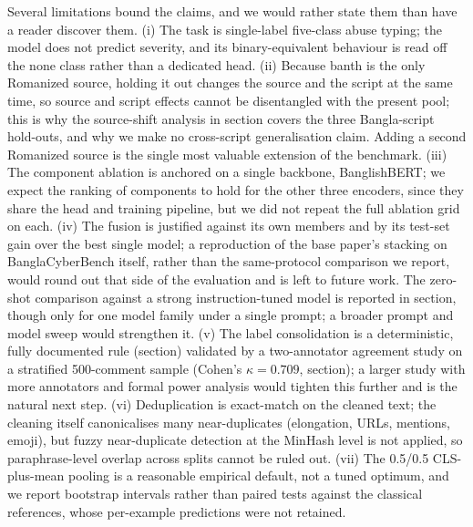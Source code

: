 \documentclass[11pt,a4paper]{article}
\def\dset#1{#1}%
\def\cref#1{section}%
\def\textsc#1{#1}%
\def\emph#1{#1}%
\providecommand{\dset}[1]{\textsc{#1}}
\newcommand{\bench}{BanglaCyberBench}
\begin{document}
Several limitations bound the claims, and we would rather state them than have a reader discover them. \emph{(i)} The task is single-label five-class abuse typing; the model does not predict severity, and its binary-equivalent behaviour is read off the \emph{none} class rather than a dedicated head. \emph{(ii)} Because \dset{banth} is the only Romanized source, holding it out changes the source and the script at the same time, so source and script effects cannot be disentangled with the present pool; this is why the source-shift analysis in \cref{sec:robustness-results} covers the three Bangla-script hold-outs, and why we make no cross-script generalisation claim. Adding a second Romanized source is the single most valuable extension of the benchmark. \emph{(iii)} The component ablation is anchored on a single backbone, BanglishBERT; we expect the ranking of components to hold for the other three encoders, since they share the head and training pipeline, but we did not repeat the full ablation grid on each. \emph{(iv)} The fusion is justified against its own members and by its test-set gain over the best single model; a reproduction of the base paper's stacking on \bench{} itself, rather than the same-protocol comparison we report, would round out that side of the evaluation and is left to future work. The zero-shot comparison against a strong instruction-tuned model is reported in \cref{sec:llm-baseline}, though only for one model family under a single prompt; a broader prompt and model sweep would strengthen it. \emph{(v)} The label consolidation is a deterministic, fully documented rule (\cref{tab:consolidation}) validated by a two-annotator agreement study on a stratified 500-comment sample (Cohen's $\kappa = 0.709$, \cref{sec:taxonomy}); a larger study with more annotators and formal power analysis would tighten this further and is the natural next step. \emph{(vi)} Deduplication is exact-match on the cleaned text; the cleaning itself canonicalises many near-duplicates (elongation, URLs, mentions, emoji), but fuzzy near-duplicate detection at the MinHash level is not applied, so paraphrase-level overlap across splits cannot be ruled out. \emph{(vii)} The 0.5/0.5 CLS-plus-mean pooling is a reasonable empirical default, not a tuned optimum, and we report bootstrap intervals rather than paired tests against the classical references, whose per-example predictions were not retained.

\end{document}
